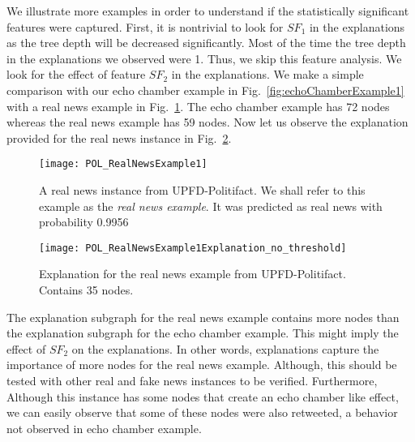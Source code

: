 We illustrate more examples in order to understand if the statistically significant features were captured. First, it is nontrivial to look for $SF_1$ in the explanations as the tree depth will be decreased significantly. Most of the time the tree depth in the explanations we observed were 1. Thus, we skip this feature analysis. We look for the effect of feature $SF_2$ in the explanations. We make a simple comparison with our echo chamber example in Fig.~\ref{fig:echoChamberExample1} with a real news example in Fig.~\ref{fig:POL_RealNewsExample1}. The echo chamber example has 72 nodes whereas the real news example has 59 nodes. Now let us observe the explanation provided for the real news instance in Fig.~\ref{fig:POL_RealNewsExample1Explanation_no_threshold}.\\
\begin{figure}
    \centering
    \texttt{[image: POL\_RealNewsExample1]}
    \caption[A real news instance from UPFD-Politifact]{A real news instance from UPFD-Politifact. We shall refer to this example as the \emph{real news example}. It was predicted as real news with probability 0.9956}
    \label{fig:POL_RealNewsExample1}
\end{figure}
\begin{figure}
    \centering
    \texttt{[image: POL\_RealNewsExample1Explanation\_no\_threshold]}
    \caption[Explanation for the real news example from UPFD-Politifact]{Explanation for the real news example from UPFD-Politifact. Contains 35 nodes.}
    \label{fig:POL_RealNewsExample1Explanation_no_threshold}
\end{figure}
The explanation subgraph for the real news example contains more nodes than the explanation subgraph for the echo chamber example. This might imply the effect of $SF_2$ on the explanations. In other words, explanations capture the importance of more nodes for the real news example. Although, this should be tested with other real and fake news instances to be verified. Furthermore, Although this instance has some nodes that create an echo chamber like effect, we can easily observe that some of these nodes were also retweeted, a behavior not observed in echo chamber example.\\
